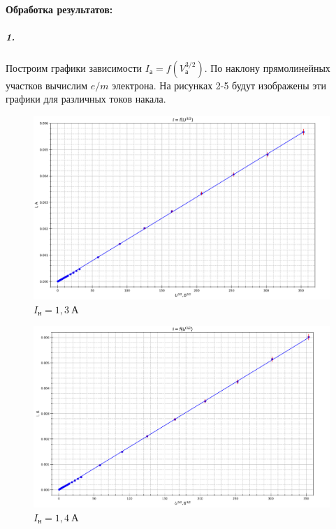 \documentclass[a4paper,12pt]{article}
\begin{document}
\paragraph{Обработка результатов:}

\subparagraph{1.} Построим графики зависимости $I_а=f(V_{а}^{3/2})$. По наклону прямолинейных участков вычислим $e/m$ электрона. На рисунках 2-5 будут изображены эти графики для различных токов накала.

\newpage

\begin{figure}[!h]
\centering
\includegraphics[width=0.9\linewidth]{I=1,3.png}
\caption{$I_{н}=1,3~А$}
\label{fig:mpr}
\end{figure}

\begin{figure}[!h]
\centering
\includegraphics[width=0.9\linewidth]{I=1,4.png}
\caption{$I_{н}=1,4~А$}
\label{fig:mpr}
\end{figure}

\newpage
\end{document}
